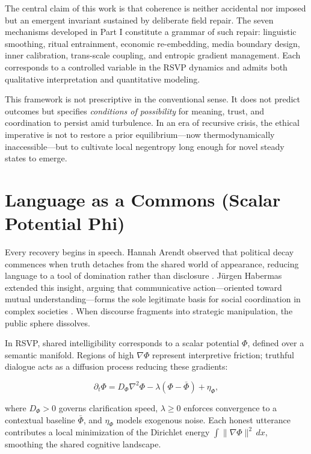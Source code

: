 \documentclass[12pt,a4paper]{article}
\begin{document}
The central claim of this work is that coherence is neither accidental nor imposed but an emergent invariant sustained by deliberate field repair. The seven mechanisms developed in Part I constitute a grammar of such repair: linguistic smoothing, ritual entrainment, economic re-embedding, media boundary design, inner calibration, trans-scale coupling, and entropic gradient management. Each corresponds to a controlled variable in the RSVP dynamics and admits both qualitative interpretation and quantitative modeling.

This framework is not prescriptive in the conventional sense. It does not predict outcomes but specifies \emph{conditions of possibility} for meaning, trust, and coordination to persist amid turbulence. In an era of recursive crisis, the ethical imperative is not to restore a prior equilibrium—now thermodynamically inaccessible—but to cultivate local negentropy long enough for novel steady states to emerge.

\section{Language as a Commons (Scalar Potential Phi)}
Every recovery begins in speech. Hannah Arendt observed that political decay commences when truth detaches from the shared world of appearance, reducing language to a tool of domination rather than disclosure \cite{arendt1967truth}. Jürgen Habermas extended this insight, arguing that communicative action—oriented toward mutual understanding—forms the sole legitimate basis for social coordination in complex societies \cite{habermas1984communicative}. When discourse fragments into strategic manipulation, the public sphere dissolves.

In RSVP, shared intelligibility corresponds to a scalar potential $\Phi$, defined over a semantic manifold. Regions of high $\nabla\Phi$ represent interpretive friction; truthful dialogue acts as a diffusion process reducing these gradients:

\begin{equation}
\partial_t \Phi = D_\Phi \nabla^2 \Phi - \lambda (\Phi - \bar{\Phi}) + \eta_\Phi,
\label{eq:phi-diffusion}
\end{equation}

where $D_\Phi > 0$ governs clarification speed, $\lambda \ge 0$ enforces convergence to a contextual baseline $\bar{\Phi}$, and $\eta_\Phi$ models exogenous noise. Each honest utterance contributes a local minimization of the Dirichlet energy $\int \|\nabla \Phi\|^2\,dx$, smoothing the shared cognitive landscape.
\end{document}
